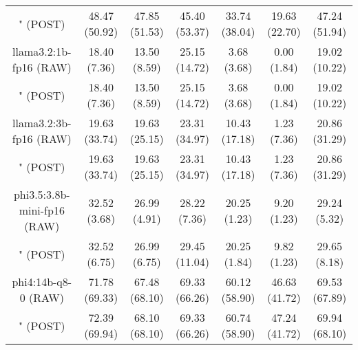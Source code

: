 \begin{table}[]
{\begin{tabular}{ccccccc}
        

        \multicolumn{1}{c|}{" (POST)} & 48.47 (50.92) & 47.85 (51.53) & \multicolumn{1}{c|}{45.40 (53.37)} & 33.74 (38.04) & \multicolumn{1}{c|}{19.63 (22.70)} & 47.24 (51.94) \\
        \cline{1-7}
        

        \multicolumn{1}{c|}{llama3.2:1b-fp16 (RAW)} & 18.40 (7.36) & 13.50 (8.59) & \multicolumn{1}{c|}{25.15 (14.72)} & 3.68 (3.68) & \multicolumn{1}{c|}{0.00 (1.84)} & 19.02 (10.22) \\
        
        

        \multicolumn{1}{c|}{" (POST)} & 18.40 (7.36) & 13.50 (8.59) & \multicolumn{1}{c|}{25.15 (14.72)} & 3.68 (3.68) & \multicolumn{1}{c|}{0.00 (1.84)} & 19.02 (10.22) \\
        \cline{1-7}
        

        \multicolumn{1}{c|}{llama3.2:3b-fp16 (RAW)} & 19.63 (33.74) & 19.63 (25.15) & \multicolumn{1}{c|}{23.31 (34.97)} & 10.43 (17.18) & \multicolumn{1}{c|}{1.23 (7.36)} & 20.86 (31.29) \\
        
        

        \multicolumn{1}{c|}{" (POST)} & 19.63 (33.74) & 19.63 (25.15) & \multicolumn{1}{c|}{23.31 (34.97)} & 10.43 (17.18) & \multicolumn{1}{c|}{1.23 (7.36)} & 20.86 (31.29) \\
        \cline{1-7}
        

        \multicolumn{1}{c|}{phi3.5:3.8b-mini-fp16 (RAW)} & 32.52 (3.68) & 26.99 (4.91) & \multicolumn{1}{c|}{28.22 (7.36)} & 20.25 (1.23) & \multicolumn{1}{c|}{9.20 (1.23)} & 29.24 (5.32) \\
        
        

        \multicolumn{1}{c|}{" (POST)} & 32.52 (6.75) & 26.99 (6.75) & \multicolumn{1}{c|}{29.45 (11.04)} & 20.25 (1.84) & \multicolumn{1}{c|}{9.82 (1.23)} & 29.65 (8.18) \\
        \cline{1-7}
        

        \multicolumn{1}{c|}{phi4:14b-q8-0 (RAW)} & 71.78 (69.33) & 67.48 (68.10) & \multicolumn{1}{c|}{69.33 (66.26)} & 60.12 (58.90) & \multicolumn{1}{c|}{46.63 (41.72)} & 69.53 (67.89) \\
        
        

        \multicolumn{1}{c|}{" (POST)} & 72.39 (69.94) & 68.10 (68.10) & \multicolumn{1}{c|}{69.33 (66.26)} & 60.74 (58.90) & \multicolumn{1}{c|}{47.24 (41.72)} & 69.94 (68.10) \\
        \cline{1-7}
        


\end{tabular}}
\end{table}
